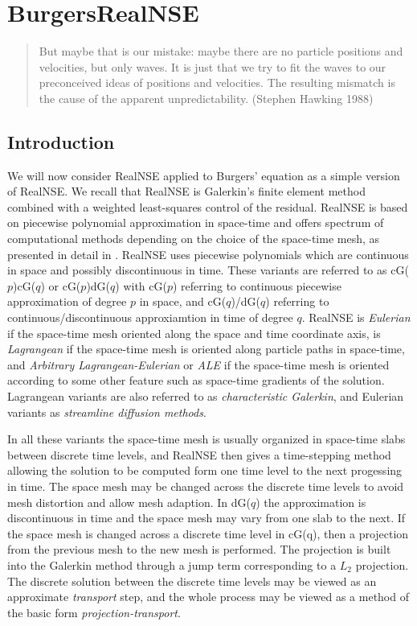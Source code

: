  

\chapter{BurgersRealNSE}

\small
\begin{quote} But maybe that is our mistake: 
maybe there are no particle positions and velocities, but only waves. 
It is just that we try to fit the waves to our preconceived ideas of 
positions and velocities. The resulting mismatch is the cause of the 
apparent unpredictability. (Stephen Hawking 1988)
\end{quote}
\normalsize  

\section{Introduction}
We will now consider RealNSE applied to Burgers' equation as a simple
version of RealNSE. We recall that RealNSE is Galerkin's 
finite element method
combined with a weighted least-squares control of the
residual. RealNSE is based on  piecewise polynomial approximation
in space-time and offers spectrum of computational methods 
depending on the choice of the space-time
mesh, as presented in detail in \cite{cde,ambsflow}.
RealNSE uses piecewise polynomials which are
continuous in space and possibly discontinuous in time.
These variants are referred to as cG($p$)cG($q$) or cG($p$)dG($q$) with
cG($p$) referring to continuous piecewise approximation of degree $p$
in space, and cG($q$)/dG($q$) referring to  continuous/discontinuous
approxiamtion in time of degree $q$. RealNSE is \emph{Eulerian} if
the space-time mesh oriented along the space and time coordinate axis, 
is \emph{Lagrangean} if the space-time mesh is oriented along particle
paths in space-time, and \emph{Arbitrary Lagrangean-Eulerian} or \emph{ALE} 
if the space-time mesh is oriented according to some other feature such as
space-time gradients of the solution. 
Lagrangean variants are also referred to as \emph{characteristic Galerkin}, 
and Eulerian variants as \emph{streamline diffusion methods}.

In all these variants the space-time mesh is usually organized in
space-time slabs between discrete time levels, and RealNSE then
gives a time-stepping method allowing the solution to be
computed form one time level to the next progessing in time. The
space mesh may be changed across the discrete time levels to avoid 
mesh distortion and allow mesh adaption. In dG($q$) the
approximation is discontinuous in time and the space
mesh may vary from one slab to the next. If the space mesh is changed 
across a discrete time level in cG(q), then
a projection from the previous mesh 
to the new mesh is performed. The projection is built 
into the Galerkin method  through a jump term corresponding to a 
$L_2$ projection. The discrete solution between the
discrete time levels may be viewed as an approximate {\em transport} step,
and the whole process may be viewed as a method of the basic form
\emph{projection-transport}. 

